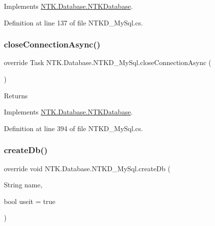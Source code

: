 Implements \mbox{\hyperlink{class_n_t_k_1_1_database_1_1_n_t_k_database_a0c7312d31c1a7df56e7a70ae72c08d89}{N\+T\+K.\+Database.\+N\+T\+K\+Database}}.



Definition at line 137 of file N\+T\+K\+D\+\_\+\+My\+Sql.\+cs.

\mbox{\label{class_n_t_k_1_1_database_1_1_n_t_k_d___my_sql_af3c165d5298437959df53c53ecf75c12}} 
\subsubsection{\texorpdfstring{closeConnectionAsync()}{closeConnectionAsync()}}
{\footnotesize\ttfamily override Task N\+T\+K.\+Database.\+N\+T\+K\+D\+\_\+\+My\+Sql.\+close\+Connection\+Async (\begin{DoxyParamCaption}{ }\end{DoxyParamCaption})\hspace{0.3cm}{\ttfamily [virtual]}}





\begin{DoxyReturn}{Returns}

\end{DoxyReturn}


Implements \mbox{\hyperlink{class_n_t_k_1_1_database_1_1_n_t_k_database_a83ee63ae23c9736899f2b033db6d4838}{N\+T\+K.\+Database.\+N\+T\+K\+Database}}.



Definition at line 394 of file N\+T\+K\+D\+\_\+\+My\+Sql.\+cs.

\mbox{\label{class_n_t_k_1_1_database_1_1_n_t_k_d___my_sql_a6a33910d27ce2b66e2e0d2bf87469c33}} 
\subsubsection{\texorpdfstring{createDb()}{createDb()}\hspace{0.1cm}{\footnotesize\ttfamily [1/2]}}
{\footnotesize\ttfamily override void N\+T\+K.\+Database.\+N\+T\+K\+D\+\_\+\+My\+Sql.\+create\+Db (\begin{DoxyParamCaption}\item[{String}]{name,  }\item[{bool}]{useit = {\ttfamily true} }\end{DoxyParamCaption})\hspace{0.3cm}{\ttfamily [virtual]}}



